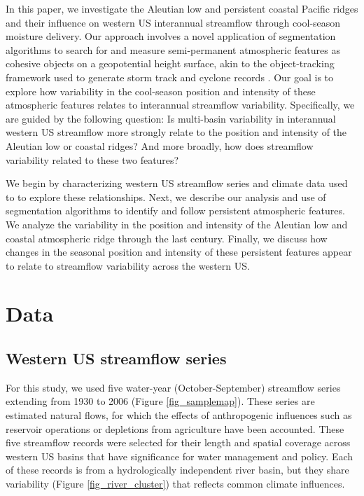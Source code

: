 \documentclass[final, double]{ua-thesis}
\begin{document}
In this paper, we investigate the Aleutian low and persistent coastal Pacific ridges and their influence on western US interannual streamflow through cool-season moisture delivery. Our approach involves a novel application of segmentation algorithms to search for and measure semi-permanent atmospheric features as cohesive objects on a geopotential height surface, akin to the object-tracking framework used to generate storm track and cyclone records \citep[e.g., ][]{2hodges_general_1994, 2hoskins_new_2002}. Our goal is to explore how variability in the cool-season position and intensity of these atmospheric features relates to interannual streamflow variability. Specifically, we are guided by the following question: Is multi-basin variability in interannual western US streamflow more strongly relate to the position and intensity of the Aleutian low or coastal ridges? And more broadly, how does streamflow variability related to these two features?

We begin by characterizing western US streamflow series and climate data used to to explore these relationships. Next, we describe our analysis and use of segmentation algorithms to identify and follow persistent atmospheric features. We analyze the variability in the position and intensity of the Aleutian low and coastal atmospheric ridge through the last century. Finally, we discuss how changes in the seasonal position and intensity of these persistent features appear to relate to streamflow variability across the western US.

\section{Data}

\subsection{Western US streamflow series}

For this study, we used five water-year (October-September) streamflow series extending from 1930 to 2006 (Figure \ref{fig_samplemap}). These series are estimated natural flows, for which the effects of anthropogenic influences such as reservoir operations or depletions from agriculture have been accounted. These five streamflow records were selected for their length and spatial coverage across western US basins that have significance for water management and policy. Each of these records is from a hydrologically independent river basin, but they share variability (Figure \ref{fig_river_cluster}) that reflects common climate influences. 
\end{document}
